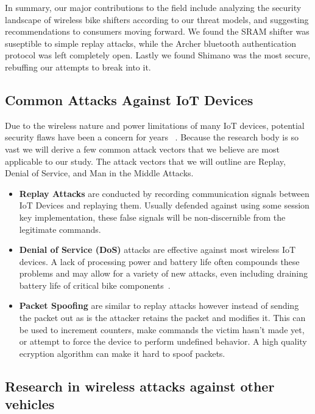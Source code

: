 \documentclass[letterpaper,twocolumn,10pt]{article}
\begin{document}
In summary, our major contributions to the field include analyzing the security landscape of wireless bike shifters according to our threat models, and suggesting recommendations to consumers moving forward. We found the SRAM shifter was suseptible to simple replay attacks, while the Archer bluetooth authentication protocol was left completely open. Lastly we found Shimano was the most secure, rebuffing our attempts to break into it.

\subsection{Common Attacks Against IoT Devices}

Due to the wireless nature and power limitations of many IoT devices, potential security flaws have been a concern for years~ \cite{HeXu}. Because the research body is so vast we will derive a few common attack vectors that we believe are most applicable to our study. The attack vectors that we will outline are Replay, Denial of Service, and Man in the Middle Attacks.

\begin{itemize}
  \item \textbf{Replay Attacks} are conducted by recording communication signals between IoT Devices and replaying them. Usually defended against using some session key implementation, these false signals will be non-discernible from the legitimate commands.
  \item \textbf{Denial of Service (DoS)} attacks are effective against most wireless IoT devices. A lack of processing power and battery life often compounds these problems and may allow for a variety of new attacks, even including draining battery life of critical bike components~\cite{Moyers}.
  \item \textbf{Packet Spoofing} are similar to replay attacks however instead of sending the packet out as is the attacker retains the packet and modifies it. This can be used to increment counters, make commands the victim hasn't made yet, or attempt to force the device to perform undefined behavior. A high quality ecryption algorithm can make it hard to spoof packets.
\end{itemize}

\subsection{Research in wireless attacks against other vehicles}
\end{document}

